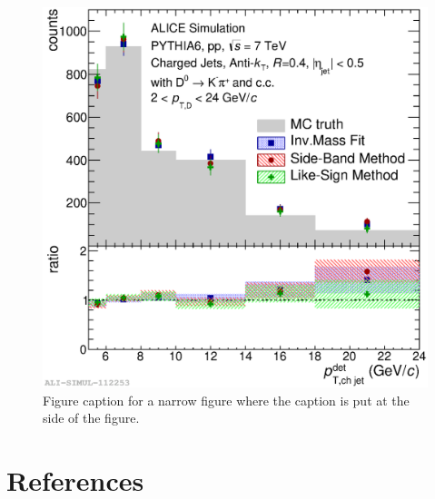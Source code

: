 \documentclass[a4paper]{jpconf}
\begin{document}
\begin{figure}[h]
\includegraphics[width=.57\textwidth]{img/HQ16_Simulation_MethodComparison}\hspace{1pc}%
\begin{minipage}[b]{.39\textwidth}\caption{\label{label}Figure caption for a narrow figure where the caption is put at the side of the figure.}
\end{minipage}
\end{figure}

\section*{References}
{}

\end{document}
